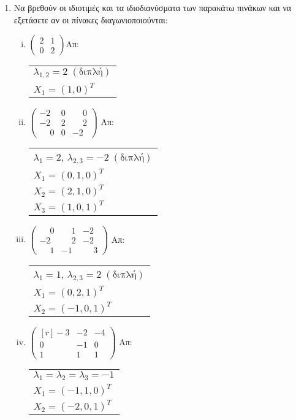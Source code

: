 \begin{enumerate}
\begin{enumerate}[i)]
\end{enumerate}

\item Να βρεθούν οι ιδιοτιμές και τα ιδιοδιανύσματα των παρακάτω πινάκων 
  και να εξετάσετε αν οι πίνακες διαγωνιοποιούνται:

\begin{enumerate}[i)]

\item $\begin{pmatrix}
2 & 1 \\
0 & 2
\end{pmatrix}$\hfill Απ: \begin{tabular}{l}
$\lambda_{1,2}=2 \; (\text{διπλή})$ \\
$X_1=(1,0)^T$ \\
\end{tabular}

\item $\begin{pmatrix}
-2 & 0 & \phantom{-}0 \\
-2 & 2 & \phantom{-}2 \\
\phantom{-}0 & 0 & -2
\end{pmatrix}$ \hfill Απ: \begin{tabular}{l}
$\lambda_1=2$, $\lambda_{2,3}=-2 \; (\text{διπλή})$ \\ 
$X_1=(0,1,0)^T$ \\
$X_2=(2,1,0)^T$ \\
$X_3=(1,0,1)^T$
\end{tabular}



\item $\begin{pmatrix}
\phantom{-}0 & \phantom{-}1 & -2 \\
-2 & \phantom{-}2 & -2 \\
\phantom{-}1 & -1 & \phantom{-}3
\end{pmatrix}$ \hfill Απ: \begin{tabular}{l}
$\lambda_1=1$, $\lambda_{2,3}=2 \; (\text{διπλή})$ \\ 
$X_1=(0,2,1)^T$ \\
$X_2=(-1,0,1)^T$ \\
\end{tabular}

\item $ \begin{pmatrix*}[r]
		-3 & -2 & -4 \\
		0 & -1 & 0 \\
		1 & 1 & 1 
\end{pmatrix*}$ \hfill Απ: \begin{tabular}{l}
$ \lambda_{1} = \lambda_{2} = \lambda_{3} = -1 $ \\
$ X_{1} = (-1,1,0)^T$ \\
$ X_{2} = (-2,0,1)^{T} $
\end{tabular}


\end{enumerate}
\end{enumerate}
